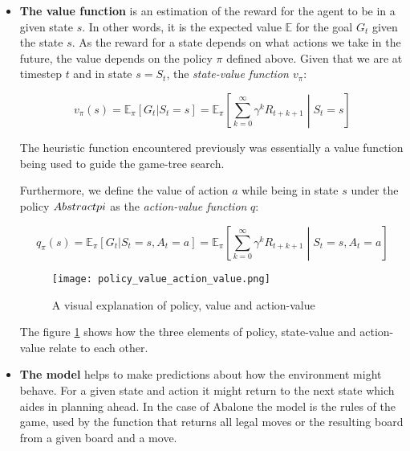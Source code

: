 \begin{itemize}
    \item \textbf{The value function} is an estimation of the reward for the agent to be in a given state $ s $. In other words, it is the expected value $\mathbb{E}$  for the goal $G_t$ given the state $s$.  As the reward for a state depends on what actions we take in the future, the value depends on the policy $ \pi $ defined above. Given that we are at timestep $ t $ and in state $ s = S_t $, the \textit{state-value function $v_{\pi}$}:

          \begin{equation}
              v_{\pi}(s) = \mathbb{E}_{\pi}[G_t | S_t = s] = \mathbb{E}_{\pi}\left[\sum_{k=0}^{\infty} \gamma^kR_{t+k+1} \middle| S_t = s \right]
          \end{equation}

          The heuristic function encountered previously was essentially a value function being used to guide the game-tree search.

          Furthermore, we define the value of action $a$ while being in state $s$ under the policy $\abstractname{}pi$ as the \textit{action-value function} $q$:


          \begin{equation}
              q_{\pi}(s) = \mathbb{E}_{\pi}[G_t | S_t = s, A_t = a] = \mathbb{E}_{\pi}\left[\sum_{k=0}^{\infty} \gamma^kR_{t+k+1} \middle| S_t = s, A_t = a \right]
          \end{equation}

          \begin{figure}
              \centering
              \texttt{[image: policy\_value\_action\_value.png]}
              \caption{A visual explanation of policy, value and action-value \cite[p.62]{sutton_reinforcement_2018}}
              \label{policy_value_action_value}
          \end{figure}

          The figure \ref{policy_value_action_value} shows how the three elements of policy, state-value and action-value relate to each other.

    \item \textbf{The model} helps to make predictions about how the environment might behave. For a given state and action it might return to the next state which aides in planning ahead. In the case of Abalone the model is the rules of the game, used by the function that returns all legal moves or the resulting board from a given board and a move.
\end{itemize}

